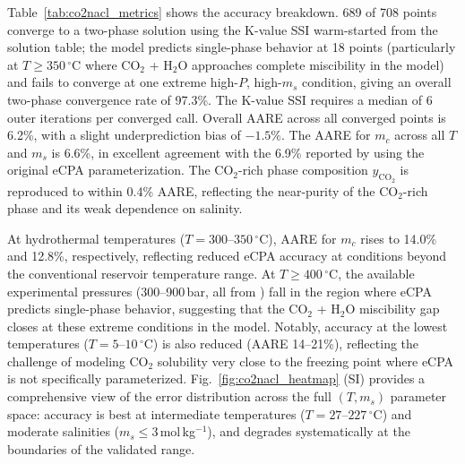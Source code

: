 \documentclass[preprint,12pt,authoryear]{elsarticle}
\begin{document}
Table~\ref{tab:co2nacl_metrics} shows the accuracy breakdown.
689 of 708 points converge to a two-phase solution using the K-value SSI warm-started
from the solution table; the model predicts single-phase behavior at 18 points
(particularly at $T \geq 350\,^\circ$C where CO$_2$ + H$_2$O approaches complete
miscibility in the model) and fails to converge at one extreme high-$P$, high-$m_s$
condition, giving an overall two-phase convergence rate of 97.3\%.
The K-value SSI requires a median of 6 outer iterations per converged call.
Overall AARE across all converged points is 6.2\%, with a slight underprediction bias
of $-1.5\%$.
The AARE for $m_c$ across all $T$ and $m_s$ is 6.6\%, in excellent agreement with the 6.9\%
reported by \citet{Coelho2025} using the original eCPA parameterization.
The CO$_2$-rich phase composition $y_{\text{CO}_2}$ is reproduced to within 0.4\% AARE, reflecting the
near-purity of the CO$_2$-rich phase and its weak dependence on salinity.

At hydrothermal temperatures ($T = 300$--$350\,^\circ$C), AARE for $m_c$ rises to 14.0\% and
12.8\%, respectively, reflecting reduced eCPA accuracy at conditions beyond the
conventional reservoir temperature range.
At $T \geq 400\,^\circ$C, the available experimental pressures (300--900\,bar, all from
\citealt{Takenouchi1965}) fall in the region where eCPA predicts single-phase behavior,
suggesting that the CO$_2$ + H$_2$O miscibility gap closes at these extreme conditions
in the model.
Notably, accuracy at the lowest temperatures ($T = 5$--$10\,^\circ$C) is also reduced
(AARE 14--21\%), reflecting the challenge of modeling CO$_2$ solubility very close to
the freezing point where eCPA is not specifically parameterized.
Fig.~\ref{fig:co2nacl_heatmap} (SI) provides a comprehensive view of the error distribution
across the full $(T, m_s)$ parameter space: accuracy is best at intermediate temperatures
($T = 27$--$227\,^\circ$C) and moderate salinities ($m_s \leq 3$\,mol\,kg$^{-1}$), and degrades
systematically at the boundaries of the validated range.
\end{document}
